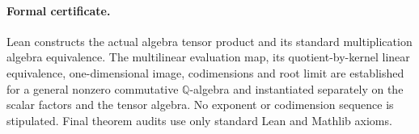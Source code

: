 \documentclass[11pt]{article}
\begin{document}
\paragraph{Formal certificate.}
Lean constructs the actual algebra tensor product and its standard
multiplication algebra equivalence. The multilinear evaluation map,
its quotient-by-kernel linear equivalence, one-dimensional image,
codimensions and root limit are established for a general nonzero
commutative $\mathbb Q$-algebra and instantiated separately on the
scalar factors and the tensor algebra. No exponent or codimension
sequence is stipulated. Final theorem audits use only standard Lean
and Mathlib axioms.
\end{document}
